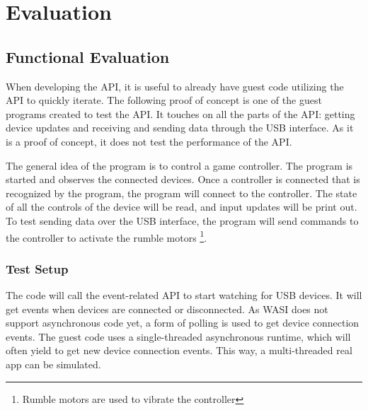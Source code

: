 \chapter{Evaluation}

\section{Functional Evaluation}
\label{section:functional_evaluation}
When developing the API, it is useful to already have guest code utilizing the API to quickly iterate. The following proof of concept is one of the guest programs created to test the API. It touches on all the parts of the API: getting device updates and receiving and sending data through the USB interface. As it is a proof of concept, it does not test the performance of the API.

The general idea of the program is to control a game controller. The program is started and observes the connected devices. Once a controller is connected that is recognized by the program, the program will connect to the controller. The state of all the controls of the device will be read, and input updates will be print out. To test sending data over the USB interface, the program will send commands to the controller to activate the rumble motors \footnote{Rumble motors are used to vibrate the controller}.

\subsection{Test Setup}
The code will call the event-related API to start watching for USB devices. It will get events when devices are connected or disconnected. As WASI does not support asynchronous code yet, a form of polling is used to get device connection events. The guest code uses a single-threaded asynchronous runtime, which will often yield to get new device connection events. This way, a multi-threaded real app can be simulated.

